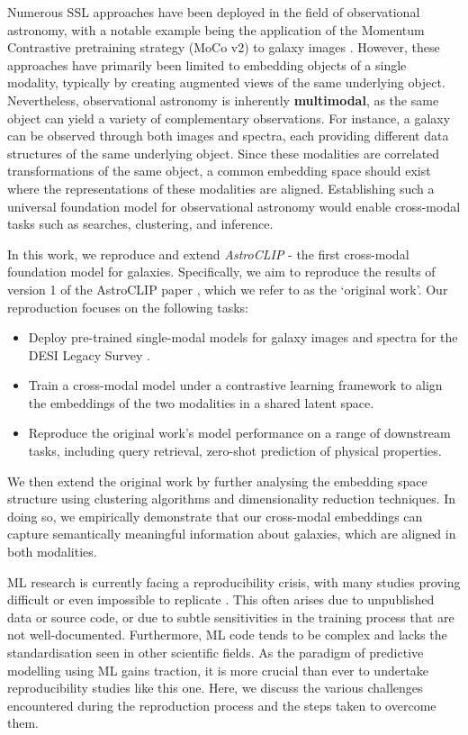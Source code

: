 \documentclass[a4paper,12pt]{article}
\begin{document}
Numerous SSL approaches have been deployed in the field of observational astronomy, with a notable example being the application of the Momentum Contrastive pretraining strategy (MoCo v2) to galaxy images \cite{stein}. However, these approaches have primarily been limited to embedding objects of a single modality, typically by creating augmented views of the same underlying object. Nevertheless, observational astronomy is inherently \textbf{multimodal}, as the same object can yield a variety of complementary observations. For instance, a galaxy can be observed through both images and spectra, each providing different data structures of the same underlying object. Since these modalities are correlated transformations of the same object, a common embedding space should exist where the representations of these modalities are aligned. Establishing such a universal foundation model for observational astronomy would enable cross-modal tasks such as searches, clustering, and inference.

In this work, we reproduce and extend \emph{AstroCLIP} - the first cross-modal foundation model for galaxies. Specifically, we aim to reproduce the results of version 1 of the AstroCLIP paper \cite{astroclip}, which we refer to as the `original work'. Our reproduction focuses on the following tasks:
\begin{itemize}
    \item Deploy pre-trained single-modal models for galaxy images and spectra for the DESI Legacy Survey \cite{DESI}.
    \item Train a cross-modal model under a contrastive learning framework to align the embeddings of the two modalities in a shared latent space.
    \item Reproduce the original work's model performance on a range of downstream tasks, including query retrieval, zero-shot prediction of physical properties.
\end{itemize}
We then extend the original work by further analysing the embedding space structure using clustering algorithms and dimensionality reduction techniques. In doing so, we empirically demonstrate that our cross-modal embeddings can capture semantically meaningful information about galaxies, which are aligned in both modalities.

ML research is currently facing a reproducibility crisis, with many studies proving difficult or even impossible to replicate \cite{kapoor2023leakage}. This often arises due to unpublished data or source code, or due to subtle sensitivities in the training process that are not well-documented. Furthermore, ML code tends to be complex and lacks the standardisation seen in other scientific fields. As the paradigm of predictive modelling using ML gains traction, it is more crucial than ever to undertake reproducibility studies like this one. Here, we discuss the various challenges encountered during the reproduction process and the steps taken to overcome them.
\end{document}
